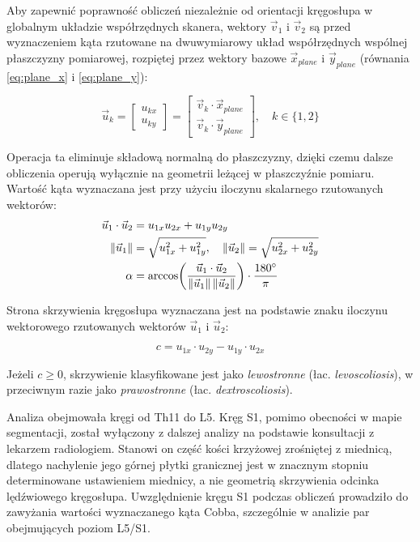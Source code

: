 Aby zapewnić poprawność obliczeń niezależnie od orientacji kręgosłupa w globalnym układzie współrzędnych skanera, wektory $\vec{v}_1$ i $\vec{v}_2$ są przed wyznaczeniem kąta rzutowane na dwuwymiarowy układ współrzędnych wspólnej płaszczyzny pomiarowej, rozpiętej przez wektory bazowe $\vec{x}_{plane}$ i $\vec{y}_{plane}$ (równania \eqref{eq:plane_x} i \eqref{eq:plane_y}):

\begin{equation}
    \vec{u}_k = \begin{bmatrix} u_{kx} \\ u_{ky} \end{bmatrix} = \begin{bmatrix} \vec{v}_k \cdot \vec{x}_{plane} \\ \vec{v}_k \cdot \vec{y}_{plane} \end{bmatrix}, \quad k \in \{1, 2\}
\end{equation}

Operacja ta eliminuje składową normalną do płaszczyzny, dzięki czemu dalsze obliczenia operują wyłącznie na geometrii leżącej w płaszczyźnie pomiaru.
Wartość kąta wyznaczana jest przy użyciu iloczynu skalarnego rzutowanych wektorów:
\begin{equation} \label{eq:cobb}
\begin{aligned}
    \vec{u}_1 \cdot \vec{u}_2 &= u_{1x} u_{2x} + u_{1y} u_{2y} \\
    \|\vec{u}_1\| &= \sqrt{u_{1x}^2 + u_{1y}^2}, \quad \|\vec{u}_2\| = \sqrt{u_{2x}^2 + u_{2y}^2} \\
    \alpha &= \arccos\!\left(\frac{\vec{u}_1 \cdot \vec{u}_2}{\|\vec{u}_1\|\,\|\vec{u}_2\|}\right) \cdot \frac{180\degree}{\pi}
\end{aligned}
\end{equation}

Strona skrzywienia kręgosłupa wyznaczana jest na podstawie znaku iloczynu wektorowego rzutowanych wektorów $\vec{u}_1$ i $\vec{u}_2$:

\begin{equation} \label{eq:cross_sign}
    c = u_{1x} \cdot u_{2y} - u_{1y} \cdot u_{2x}
\end{equation}

Jeżeli $c \geq 0$, skrzywienie klasyfikowane jest jako \textit{lewostronne} (łac. \textit{levoscoliosis}), w przeciwnym razie jako \textit{prawostronne} (łac. \textit{dextroscoliosis}).

Analiza obejmowała kręgi od Th11 do L5.
Kręg S1, pomimo obecności w mapie segmentacji, został wyłączony z dalszej analizy na podstawie konsultacji z lekarzem radiologiem. Stanowi on część kości krzyżowej zrośniętej z miednicą, dlatego nachylenie jego górnej płytki granicznej jest w znacznym stopniu determinowane ustawieniem miednicy, a nie geometrią skrzywienia odcinka lędźwiowego kręgosłupa. Uwzględnienie kręgu S1 podczas obliczeń prowadziło do zawyżania wartości wyznaczanego kąta Cobba, szczególnie w analizie par obejmujących poziom L5/S1.

